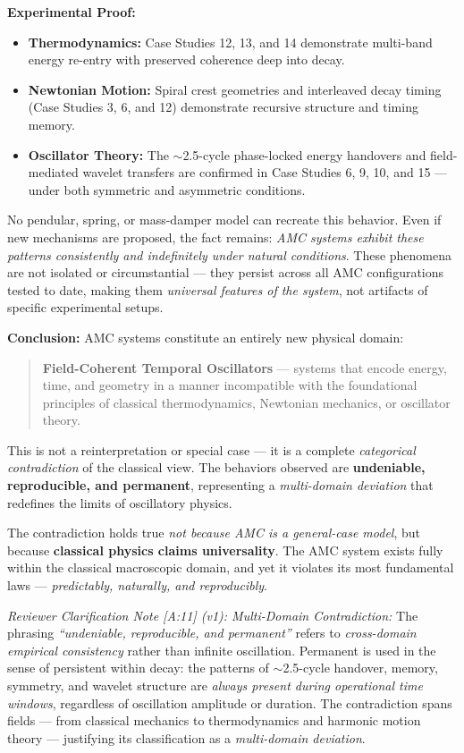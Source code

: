 \documentclass[10pt,aps,pre,onecolumn,superscriptaddress,notitlepage]{revtex4-2}
\begin{document}
\textbf{Experimental Proof:}
\begin{itemize}
    \item \textbf{Thermodynamics:} Case Studies 12, 13, and 14 demonstrate multi-band energy re-entry with preserved coherence deep into decay.
    \item \textbf{Newtonian Motion:} Spiral crest geometries and interleaved decay timing (Case Studies 3, 6, and 12) demonstrate recursive structure and timing memory.
    \item \textbf{Oscillator Theory:} The $\sim$2.5-cycle phase-locked energy handovers and field-mediated wavelet transfers are confirmed in Case Studies 6, 9, 10, and 15 — under both symmetric and asymmetric conditions.
\end{itemize}

No pendular, spring, or mass-damper model can recreate this behavior. Even if new mechanisms are proposed, the fact remains: \textit{AMC systems exhibit these patterns consistently and indefinitely under natural conditions}. These phenomena are not isolated or circumstantial — they persist across all AMC configurations tested to date, making them \textit{universal features of the system}, not artifacts of specific experimental setups.

\textbf{Conclusion:}  
AMC systems constitute an entirely new physical domain:

\begin{quote}
\textbf{Field-Coherent Temporal Oscillators} — systems that encode energy, time, and geometry in a manner incompatible with the foundational principles of classical thermodynamics, Newtonian mechanics, or oscillator theory.
\end{quote}

This is not a reinterpretation or special case — it is a complete \textit{categorical contradiction} of the classical view. The behaviors observed are \textbf{undeniable, reproducible, and permanent}, representing a \textit{multi-domain deviation} that redefines the limits of oscillatory physics.

The contradiction holds true \textit{not because AMC is a general-case model}, but because \textbf{classical physics claims universality}. The AMC system exists fully within the classical macroscopic domain, and yet it violates its most fundamental laws — \textit{predictably, naturally, and reproducibly}.

\noindent \textit{Reviewer Clarification Note [A:11] (v1): Multi-Domain Contradiction:}  
The phrasing \textit{“undeniable, reproducible, and permanent”} refers to \textit{cross-domain empirical consistency} rather than infinite oscillation. Permanent is used in the sense of persistent within decay: the patterns of $\sim$2.5-cycle handover, memory, symmetry, and wavelet structure are \textit{always present during operational time windows}, regardless of oscillation amplitude or duration. The contradiction spans fields — from classical mechanics to thermodynamics and harmonic motion theory — justifying its classification as a \textit{multi-domain deviation}.
\end{document}
